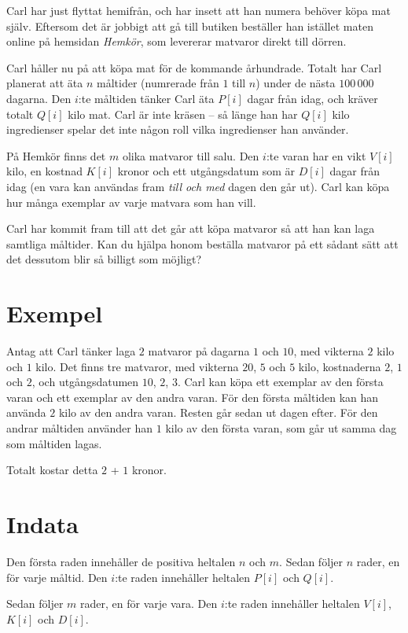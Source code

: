 Carl har just flyttat hemifrån, och har insett att han numera behöver köpa mat själv.
Eftersom det är jobbigt att gå till butiken beställer han istället maten online på hemsidan \emph{Hemkör}, som levererar matvaror direkt till dörren.

Carl håller nu på att köpa mat för de kommande århundrade.
Totalt har Carl planerat att äta $n$ måltider (numrerade från $1$ till $n$) under de nästa $100\,000$ dagarna.
Den $i$:te måltiden tänker Carl äta $P[i]$ dagar från idag, och kräver totalt $Q[i]$ kilo mat.
Carl är inte kräsen -- så länge han har $Q[i]$ kilo ingredienser spelar det inte någon roll vilka ingredienser han använder.

På Hemkör finns det $m$ olika matvaror till salu.
Den $i$:te varan har en vikt $V[i]$ kilo, en kostnad $K[i]$ kronor och ett utgångsdatum som är $D[i]$ dagar från idag (en vara kan användas fram \emph{till och med} dagen den går ut).
Carl kan köpa hur många exemplar av varje matvara som han vill.

Carl har kommit fram till att det går att köpa matvaror så att han kan laga samtliga måltider.
Kan du hjälpa honom beställa matvaror på ett sådant sätt att det dessutom blir så billigt som möjligt?

\section*{Exempel}
Antag att Carl tänker laga $2$ matvaror på dagarna $1$ och $10$, med vikterna $2$ kilo och $1$ kilo.
Det finns tre matvaror, med vikterna $20$, $5$ och $5$ kilo, kostnaderna $2$, $1$ och $2$, och utgångsdatumen $10$, $2$, $3$.
Carl kan köpa ett exemplar av den första varan och ett exemplar av den andra varan.
För den första måltiden kan han använda $2$ kilo av den andra varan.
Resten går sedan ut dagen efter.
För den andrar måltiden använder han $1$ kilo av den första varan, som går ut samma dag som måltiden lagas.

Totalt kostar detta $2$ + $1$ kronor.


\section*{Indata}
Den första raden innehåller de positiva heltalen $n$ och $m$.
Sedan följer $n$ rader, en för varje måltid.
Den $i$:te raden innehåller heltalen $P[i]$ och $Q[i]$.

Sedan följer $m$ rader, en för varje vara.
Den $i$:te raden innehåller heltalen $V[i]$, $K[i]$ och $D[i]$.

